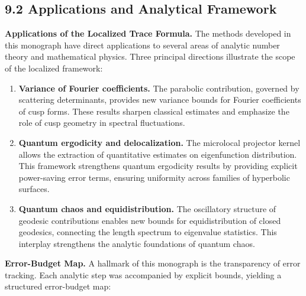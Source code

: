 

\subsection{9.2 Applications and Analytical Framework}

\noindent\textbf{Applications of the Localized Trace Formula.}
The methods developed in this monograph have direct applications to several
areas of analytic number theory and mathematical physics. Three principal
directions illustrate the scope of the localized framework:

\begin{enumerate}
  \item \textbf{Variance of Fourier coefficients.}  
  The parabolic contribution, governed by scattering determinants,
  provides new variance bounds for Fourier coefficients of cusp forms.
  These results sharpen classical estimates and emphasize the role
  of cusp geometry in spectral fluctuations.

  \item \textbf{Quantum ergodicity and delocalization.}  
  The microlocal projector kernel allows the extraction of quantitative
  estimates on eigenfunction distribution. This framework strengthens
  quantum ergodicity results by providing explicit power-saving error terms,
  ensuring uniformity across families of hyperbolic surfaces.

  \item \textbf{Quantum chaos and equidistribution.}  
  The oscillatory structure of geodesic contributions
  enables new bounds for equidistribution of closed geodesics,
  connecting the length spectrum to eigenvalue statistics.
  This interplay strengthens the analytic foundations of quantum chaos.
\end{enumerate}

\medskip

\noindent\textbf{Error-Budget Map.}
A hallmark of this monograph is the transparency of error tracking.
Each analytic step was accompanied by explicit bounds,
yielding a structured error-budget map:

